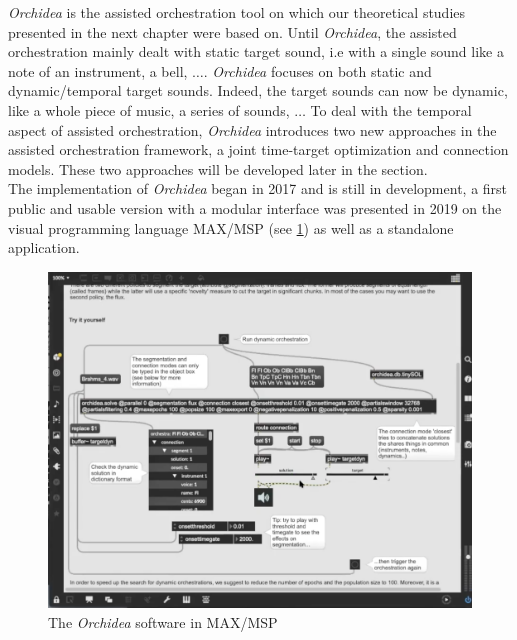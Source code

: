 \documentclass[a4paper]{book}
\begin{document}
\textit{Orchidea} is the assisted orchestration tool on which our theoretical studies presented in the next chapter were based on. Until \textit{Orchidea}, the assisted orchestration mainly dealt with static target sound, i.e with a single sound like a note of an instrument, a bell, $\ldots$. \textit{Orchidea} focuses on both static and dynamic/temporal target sounds. Indeed, the target sounds can now be dynamic, like a whole piece of music, a series of sounds, $\ldots$ To deal with the temporal aspect of assisted orchestration, \textit{Orchidea} introduces two new approaches in the assisted orchestration framework, a joint time-target optimization and connection models. These two approaches will be developed later in the section. \\
The implementation of \textit{Orchidea} began in 2017 and is still in development, a first public and usable version with a modular interface was presented in 2019 on the visual programming language MAX/MSP (see \ref{fig:max}) as well as a standalone application. \\

\begin{figure}[!ht]
    \centering
    \includegraphics[scale=0.4]{maxsol.png}
    \caption{The \textit{Orchidea} software in MAX/MSP}
    \label{fig:max}
\end{figure}
\end{document}
